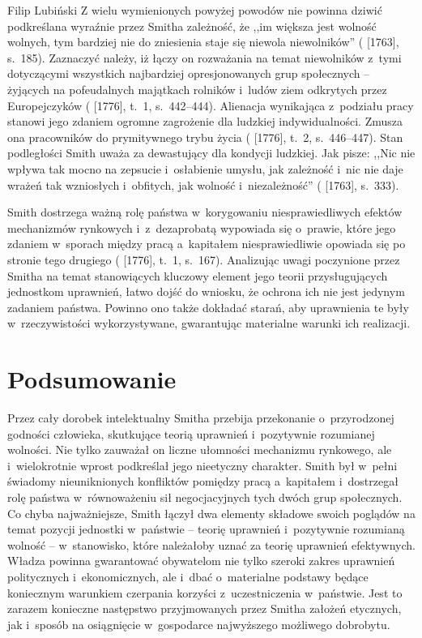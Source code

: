 \begin{artplenv}{Filip Lubiński}
Z wielu wymienionych powyżej powodów nie powinna dziwić podkreślana wyraźnie przez Smitha zależność, że ,,im większa
jest wolność wolnych, tym bardziej nie do zniesienia staje się niewola niewolników''
(\cite{smith_lectures_1982} [1763], s.~185).
Zaznaczyć należy, iż łączy on rozważania na temat niewolników z~tymi dotyczącymi wszystkich
najbardziej opresjonowanych grup społecznych -- żyjących na pofeudalnych majątkach rolników i~ludów ziem odkrytych przez
Europejczyków
(\cite{smith_badania_2007} [1776], t.~1, s.~442--444).
Alienacja wynikająca z~podziału pracy
stanowi jego zdaniem ogromne zagrożenie dla ludzkiej indywidualności. Zmusza ona pracowników do prymitywnego trybu
życia
(\cite{smith_badania_2007} [1776], t.~2, s.~446--447).
Stan podległości Smith uważa za dewastujący dla
kondycji ludzkiej. Jak pisze: ,,Nic nie wpływa tak mocno na zepsucie i~osłabienie umysłu, jak zależność i~nic nie daje
wrażeń tak wzniosłych i~obfitych, jak wolność i~niezależność''
(\cite{smith_lectures_1982} [1763], s.~333).

Smith dostrzega ważną rolę państwa w~korygowaniu niesprawiedliwych efektów mechanizmów rynkowych i~z~dezaprobatą
wypowiada się o~prawie, które jego zdaniem w~sporach między pracą a~kapitałem niesprawiedliwie opowiada się po stronie
tego drugiego
(\cite{smith_badania_2007} [1776], t.~1, s.~167).
Analizując uwagi poczynione przez Smitha na
temat stanowiących kluczowy element jego teorii przysługujących jednostkom uprawnień, łatwo dojść do wniosku, że ochrona
ich nie jest jedynym zadaniem państwa. Powinno ono także dokładać starań, aby uprawnienia te były w~rzeczywistości
wykorzystywane, gwarantując materialne warunki ich realizacji.

\section*{Podsumowanie}
Przez cały dorobek intelektualny Smitha przebija przekonanie o~przyrodzonej godności człowieka, skutkujące teorią
uprawnień i~pozytywnie rozumianej wolności. Nie tylko zauważał on liczne ułomności mechanizmu rynkowego,
ale i~wielokrotnie wprost podkreślał jego nieetyczny charakter. Smith był w~pełni świadomy nieuniknionych konfliktów pomiędzy
pracą a~kapitałem i~dostrzegał rolę państwa w~równoważeniu sił negocjacyjnych tych dwóch grup społecznych. Co chyba
najważniejsze, Smith łączył dwa elementy składowe swoich poglądów na temat pozycji jednostki w~państwie -- teorię
uprawnień i~pozytywnie rozumianą wolność -- w~stanowisko, które należałoby uznać za teorię uprawnień efektywnych. Władza
powinna gwarantować obywatelom nie tylko szeroki zakres uprawnień politycznych i~ekonomicznych, ale i~dbać o~materialne
podstawy będące koniecznym warunkiem czerpania korzyści z~uczestniczenia w~państwie. Jest to zarazem konieczne
następstwo przyjmowanych przez Smitha założeń etycznych, jak i~sposób na osiągnięcie w~gospodarce najwyższego możliwego
dobrobytu.


\end{artplenv}
